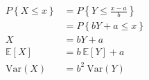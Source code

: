 \begin{enumerate}
		\begin{align}
			P \left\{X \leq x\right\} &= P \left\{ Y \leq \frac{x - a}{b}\right\} \nonumber \\
			&= P \left\{ bY + a \leq x\right\} \\
			X &= bY + a \nonumber \\
			\mathbb{E}[X] &= b\ \mathbb{E}[Y] + a \\
			\mathrm{Var}(X) &= b^2\ \mathrm{Var}(Y)
		\end{align} \\
	
	
	
\end{enumerate}
